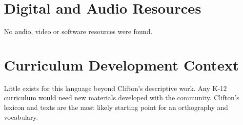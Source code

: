\documentclass[12pt]{article}
\begin{document}
\section{Digital and Audio Resources}
No audio, video or software resources were found.

\section{Curriculum Development Context}
Little exists for this language beyond Clifton's descriptive work. Any K-12 curriculum would need new materials developed with the community. Clifton's lexicon and texts are the most likely starting point for an orthography and vocabulary.
\end{document}

